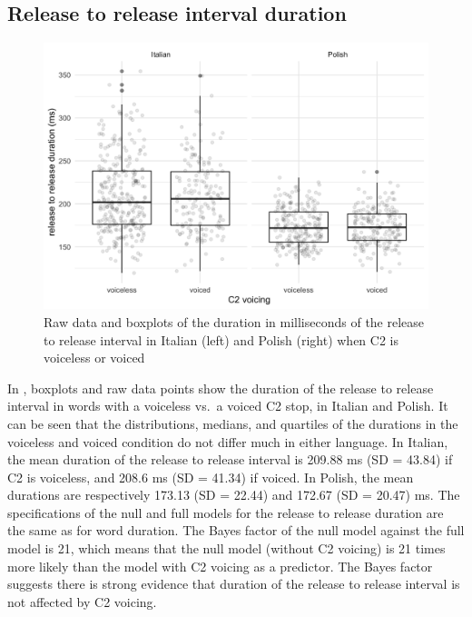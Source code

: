 \documentclass[charis]{glossa}
\begin{document}
\hypertarget{release-to-release-interval-duration}{%
\subsection{Release to release interval
duration}\label{release-to-release-interval-duration}}

\begin{figure}
\includegraphics[width=\linewidth]{./Figure5} \caption{Raw data and boxplots of the duration in milliseconds of the release to release interval in Italian (left) and Polish (right) when C2 is voiceless or voiced}\label{f:Figure5}
\end{figure}

In , boxplots and raw data points show the duration of
the release to release interval in words with a voiceless vs.~a voiced
C2 stop, in Italian and Polish. It can be seen that the distributions,
medians, and quartiles of the durations in the voiceless and voiced
condition do not differ much in either language. In Italian, the mean
duration of the release to release interval is 209.88 ms (SD = 43.84) if
C2 is voiceless, and 208.6 ms (SD = 41.34) if voiced. In Polish, the
mean durations are respectively 173.13 (SD = 22.44) and 172.67 (SD =
20.47) ms. The specifications of the null and full models for the
release to release duration are the same as for word duration. The Bayes
factor of the null model against the full model is 21, which means that
the null model (without C2 voicing) is 21 times more likely than the
model with C2 voicing as a predictor. The Bayes factor suggests there is
strong evidence that duration of the release to release interval is not
affected by C2 voicing.
\end{document}
